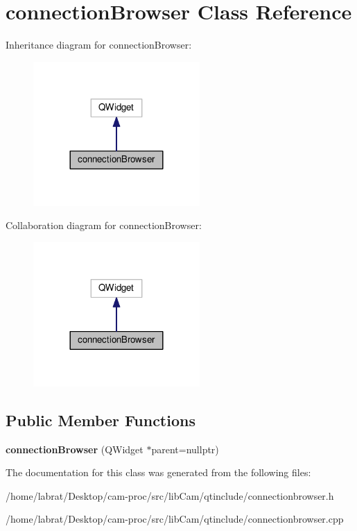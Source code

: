 \hypertarget{classconnectionBrowser}{}\section{connection\+Browser Class Reference}
\label{classconnectionBrowser}


Inheritance diagram for connection\+Browser\+:
\nopagebreak
\begin{figure}[H]
\begin{center}
\leavevmode
\includegraphics[width=180pt]{classconnectionBrowser__inherit__graph}
\end{center}
\end{figure}


Collaboration diagram for connection\+Browser\+:
\nopagebreak
\begin{figure}[H]
\begin{center}
\leavevmode
\includegraphics[width=180pt]{classconnectionBrowser__coll__graph}
\end{center}
\end{figure}
\subsection*{Public Member Functions}
\begin{DoxyCompactItemize}
\item 
{\bfseries connection\+Browser} (Q\+Widget $\ast$parent=nullptr)\hypertarget{classconnectionBrowser_a4d19db001fa9c839818765fdb2d88c58}{}\label{classconnectionBrowser_a4d19db001fa9c839818765fdb2d88c58}

\end{DoxyCompactItemize}


The documentation for this class was generated from the following files\+:\begin{DoxyCompactItemize}
\item 
/home/labrat/\+Desktop/cam-\/proc/src/lib\+Cam/qtinclude/connectionbrowser.\+h\item 
/home/labrat/\+Desktop/cam-\/proc/src/lib\+Cam/qtinclude/connectionbrowser.\+cpp\end{DoxyCompactItemize}
